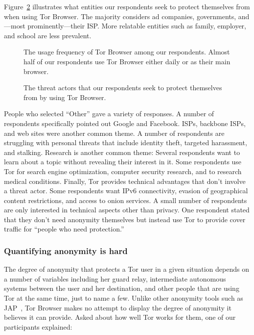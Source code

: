 Figure~\ref{fig:tor-threats} illustrates what entities our respondents seek to
protect themselves from when using Tor Browser.  The majority considers ad
companies, governments, and---most prominently---their ISP.  More relatable
entities such as family, employer, and school are less prevalent.

\begin{figure}[t]
    \centering
    
    \caption{The usage frequency of Tor Browser among our respondents.  Almost
    half of our respondents use Tor Browser either daily or as their main
    browser.}
    \label{fig:tor-usage}
\end{figure}

\begin{figure}[t]
    \centering
    
    \caption{The threat actors that our respondents seek to protect themselves
        from by using Tor Browser.}
    \label{fig:tor-threats}
\end{figure}

People who selected ``Other'' gave a variety of responses.  A number of
respondents specifically pointed out Google and Facebook.  ISPs, backbone ISPs,
and web sites were another common theme.  A number of respondents are struggling
with personal threats that include identity theft, targeted harassment, and
stalking.  Research is another common theme: Several respondents want to learn
about a topic without revealing their interest in it.  Some respondents use Tor
for search engine optimization, computer security research, and to research
medical conditions.  Finally, Tor provides technical advantages that don't
involve a threat actor.  Some respondents want IPv6 connectivity, evasion of
geographical content restrictions, and access to onion services.  A small number
of respondents are only interested in technical aspects other than privacy.  One
respondent stated that they don't need anonymity themselves but instead use Tor
to provide cover traffic for ``people who need protection.''

\subsubsection{Quantifying anonymity is hard}

The degree of anonymity that protects a Tor user in a given situation depends on
a number of variables including her guard relay, intermediate autonomous systems
between the user and her destination, and other people that are using Tor at the
same time, just to name a few.  Unlike other anonymity tools such as
JAP~\cite{jap}, Tor Browser makes no attempt to display the degree of anonymity
it believes it can provide.  Asked about how well Tor works for them, one
of our participants explained:


